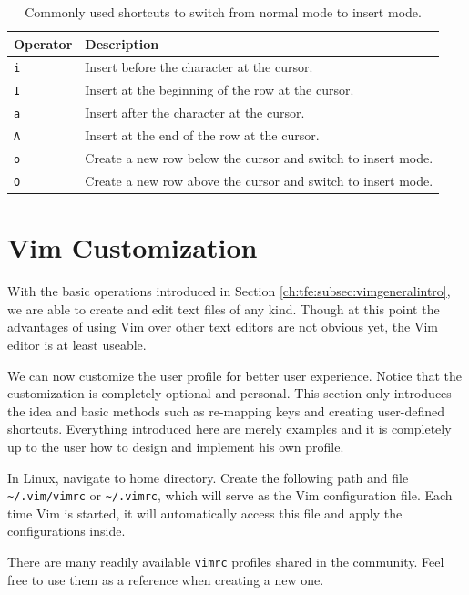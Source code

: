 \begin{table}
  \centering \caption{Commonly used shortcuts to switch from normal mode to insert mode.}\label{ch:tfe:tab:switchtoinsert}
  \begin{tabularx}{\textwidth}{lX}
    \hline
    Operator & Description \\ \hline
    \verb|i| & Insert before the character at the cursor. \\ 
    \verb|I| & Insert at the beginning of the row at the cursor. \\ 
    \verb|a| & Insert after the character at the cursor. \\ 
    \verb|A| & Insert at the end of the row at the cursor. \\ 
    \verb|o| & Create a new row below the cursor and switch to insert mode. \\ 
    \verb|O| & Create a new row above the cursor and switch to insert mode. \\
    \hline
  \end{tabularx}
\end{table}

\section{Vim Customization}

With the basic operations introduced in Section \ref{ch:tfe:subsec:vimgeneralintro}, we are able to create and edit text files of any kind. Though at this point the advantages of using Vim over other text editors are not obvious yet, the Vim editor is at least useable.

We can now customize the user profile for better user experience. Notice that the customization is completely optional and personal. This section only introduces the idea and basic methods such as re-mapping keys and creating user-defined shortcuts. Everything introduced here are merely examples and it is completely up to the user how to design and implement his own profile.

In Linux, navigate to home directory. Create the following path and file \verb|~/.vim/vimrc| or \verb|~/.vimrc|, which will serve as the Vim configuration file. Each time Vim is started, it will automatically access this file and apply the configurations inside.

There are many readily available \verb|vimrc| profiles shared in the community. Feel free to use them as a reference when creating a new one.

